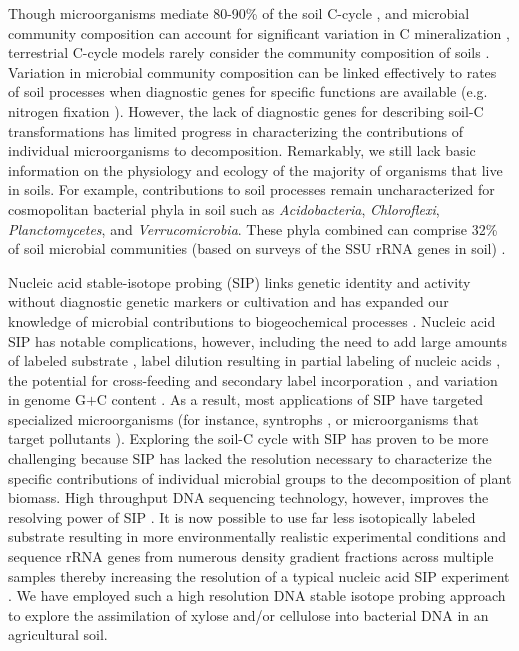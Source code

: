 Though microorganisms mediate 80-90\% of the soil C-cycle
\citep{ColemanCrossley_1996,Nannipieri_2003}, and microbial community
composition can account for significant variation in C mineralization
\citep{Strickland_2009}, terrestrial C-cycle models rarely consider the
community composition of soils \citep{Zak2006,Reed2007}. Variation in microbial
community composition can be linked effectively to rates of soil processes when
diagnostic genes for specific functions are available (e.g. nitrogen fixation
\citep{Hsu2009}).  However, the lack of diagnostic genes for describing soil-C
transformations has limited progress in characterizing the contributions of
individual microorganisms to decomposition. Remarkably, we still lack basic
information on the physiology and ecology of the majority of organisms that
live in soils. For example, contributions to soil processes remain
uncharacterized for cosmopolitan bacterial phyla in soil such as
\textit{Acidobacteria}, \textit{Chloroflexi}, \textit{Planctomycetes}, and
\textit{Verrucomicrobia}. These phyla combined can comprise 32\% of soil
microbial communities (based on surveys of the SSU rRNA genes in soil)
\citep{Janssen2006,Buckley2002}. 

Nucleic acid stable-isotope probing (SIP) links genetic identity and activity
without diagnostic genetic markers or cultivation and has expanded our
knowledge of microbial contributions to biogeochemical processes
\citep{Chen_Murrell_2010}. Nucleic acid SIP has notable complications, however,
including the need to add large amounts of labeled substrate
\citep{radajewski2000stable}, label dilution resulting in partial labeling of
nucleic acids \citep{radajewski2000stable}, the potential for cross-feeding and
secondary label incorporation \citep{DeRito2005}, and variation in genome G$+$C
content \citep{Buckley_2007}.  As a result, most applications of SIP have
targeted specialized microorganisms (for instance, syntrophs
\citep{lueders2004}, or microorganisms that target pollutants
\citep{derito2005}). Exploring the soil-C cycle with SIP has proven to be more
challenging because SIP has lacked the resolution necessary to characterize the
specific contributions of individual microbial groups to the decomposition of
plant biomass. High throughput DNA sequencing technology, however, improves the
resolving power of SIP \citep{Aoyagi2015}. It is now possible to use far less
isotopically labeled substrate resulting in more environmentally realistic
experimental conditions and sequence rRNA genes from numerous density gradient
fractions across multiple samples thereby increasing the resolution of a
typical nucleic acid SIP experiment \citep{Verastegui_2014}.  We have employed
such a high resolution DNA stable isotope probing approach to explore the
assimilation of xylose and/or cellulose into bacterial DNA in an agricultural
soil. 

